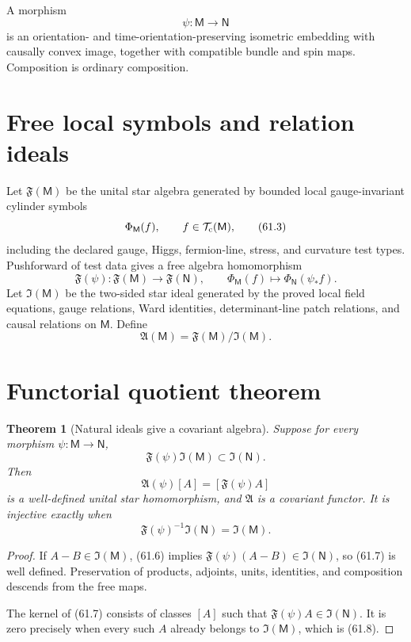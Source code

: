 \documentclass[11pt]{article}
\newtheorem{theorem}{Theorem}[section]
\theoremstyle{remark}
\begin{document}
A morphism
\[
 \psi:{\mathsf M}\longrightarrow{\mathsf N}             \tag{61.2}
\]
is an orientation- and time-orientation-preserving isometric
embedding with causally convex image, together with compatible
bundle and spin maps.  Composition is ordinary composition.

\section{Free local symbols and relation ideals}

Let \({\mathfrak F}({\mathsf M})\) be the unital star algebra
generated by bounded local gauge-invariant cylinder symbols
\[
 \Phi_{\mathsf M}(f),\qquad
 f\in{\cal T}_{\rm c}({\mathsf M}),                     \tag{61.3}
\]
including the declared gauge, Higgs, fermion-line, stress, and
curvature test types.  Pushforward of test data gives a free
algebra homomorphism
\[
 {\mathfrak F}(\psi):
 {\mathfrak F}({\mathsf M})\longrightarrow
 {\mathfrak F}({\mathsf N}),\qquad
 \Phi_{\mathsf M}(f)\mapsto\Phi_{\mathsf N}(\psi_*f).   \tag{61.4}
\]
Let \({\mathfrak I}({\mathsf M})\) be the two-sided star ideal
generated by the proved local field equations, gauge relations,
Ward identities, determinant-line patch relations, and causal
relations on \({\mathsf M}\).  Define
\[
 {\mathfrak A}({\mathsf M})
 ={\mathfrak F}({\mathsf M})/{\mathfrak I}({\mathsf M}). \tag{61.5}
\]

\section{Functorial quotient theorem}

\begin{theorem}[Natural ideals give a covariant algebra]
\label{thm:v15v61-functor}
Suppose for every morphism \(\psi:{\mathsf M}\to{\mathsf N}\),
\[
 {\mathfrak F}(\psi){\mathfrak I}({\mathsf M})
 \subset{\mathfrak I}({\mathsf N}).                     \tag{61.6}
\]
Then
\[
 {\mathfrak A}(\psi)[A]=[{\mathfrak F}(\psi)A]          \tag{61.7}
\]
is a well-defined unital star homomorphism, and
\({\mathfrak A}\) is a covariant functor.  It is injective exactly
when
\[
 \boxed{
 {\mathfrak F}(\psi)^{-1}{\mathfrak I}({\mathsf N})
 ={\mathfrak I}({\mathsf M}).}                          \tag{61.8}
\]
\end{theorem}

\begin{proof}
If \(A-B\in{\mathfrak I}({\mathsf M})\), (61.6) implies
\({\mathfrak F}(\psi)(A-B)\in{\mathfrak I}({\mathsf N})\), so
(61.7) is well defined.  Preservation of products, adjoints, units,
identities, and composition descends from the free maps.

The kernel of (61.7) consists of classes \([A]\) such that
\({\mathfrak F}(\psi)A\in{\mathfrak I}({\mathsf N})\).
It is zero precisely when every such \(A\) already belongs to
\({\mathfrak I}({\mathsf M})\), which is (61.8).
\end{proof}
\end{document}
